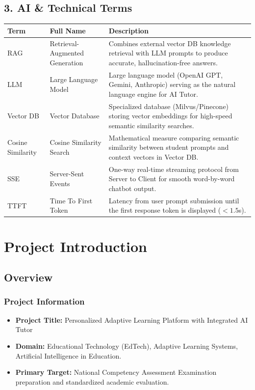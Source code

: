 \documentclass[12pt,a4paper]{article}
\begin{document}
\subsection*{3. AI \& Technical Terms}
\begin{table}[H]
\centering
\small
\renewcommand{\arraystretch}{1.3}
\begin{tabularx}{\textwidth}{p{2.6cm} p{4.2cm} X}
\toprule
\textbf{Term} & \textbf{Full Name} & \textbf{Description} \\
\midrule
RAG & Retrieval-Augmented Generation & Combines external vector DB knowledge retrieval with LLM prompts to produce accurate, hallucination-free answers. \\
\addlinespace[0.3em]
LLM & Large Language Model & Large language model (OpenAI GPT, Gemini, Anthropic) serving as the natural language engine for AI Tutor. \\
\addlinespace[0.3em]
Vector DB & Vector Database & Specialized database (Milvus/Pinecone) storing vector embeddings for high-speed semantic similarity searches. \\
\addlinespace[0.3em]
Cosine Similarity & Cosine Similarity Search & Mathematical measure comparing semantic similarity between student prompts and context vectors in Vector DB. \\
\addlinespace[0.3em]
SSE & Server-Sent Events & One-way real-time streaming protocol from Server to Client for smooth word-by-word chatbot output. \\
\addlinespace[0.3em]
TTFT & Time To First Token & Latency from user prompt submission until the first response token is displayed ($< 1.5$s). \\
\bottomrule
\end{tabularx}
\end{table}
\newpage

\section{Project Introduction}

\subsection{Overview}
\subsubsection{Project Information}
\begin{itemize}
    \item \textbf{Project Title:} Personalized Adaptive Learning Platform with Integrated AI Tutor
    \item \textbf{Domain:} Educational Technology (EdTech), Adaptive Learning Systems, Artificial Intelligence in Education.
    \item \textbf{Primary Target:} National Competency Assessment Examination preparation and standardized academic evaluation.
\end{itemize}
\end{document}
